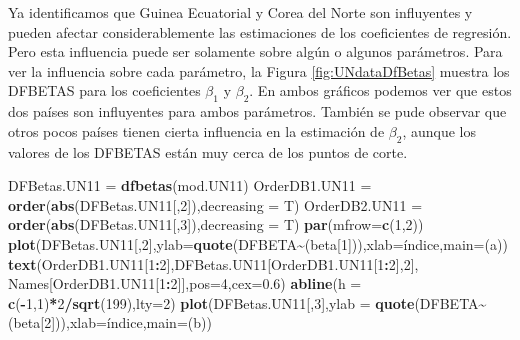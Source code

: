 \documentclass[
]{article}
\newenvironment{Shaded}{\begin{snugshade}}{\end{snugshade}}
\newcommand{\AttributeTok}[1]{\textcolor[rgb]{0.13,0.29,0.53}{#1}}
\newcommand{\DecValTok}[1]{\textcolor[rgb]{0.00,0.00,0.81}{#1}}
\newcommand{\FloatTok}[1]{\textcolor[rgb]{0.00,0.00,0.81}{#1}}
\newcommand{\FunctionTok}[1]{\textcolor[rgb]{0.13,0.29,0.53}{\textbf{#1}}}
\newcommand{\NormalTok}[1]{#1}
\newcommand{\OtherTok}[1]{\textcolor[rgb]{0.56,0.35,0.01}{#1}}
\newcommand{\SpecialCharTok}[1]{\textcolor[rgb]{0.81,0.36,0.00}{\textbf{#1}}}
\newcommand{\StringTok}[1]{\textcolor[rgb]{0.31,0.60,0.02}{#1}}
\begin{document}
Ya identificamos que Guinea Ecuatorial y Corea del Norte son influyentes y pueden afectar considerablemente las estimaciones de los coeficientes de regresión. Pero esta influencia puede ser solamente sobre algún o algunos parámetros. Para ver la influencia sobre cada parámetro, la Figura \ref{fig:UNdataDfBetas} muestra los DFBETAS para los coeficientes \(\beta_{1}\) y \(\beta_{2}\). En ambos gráficos podemos ver que estos dos países son influyentes para ambos parámetros. También se pude observar que otros pocos países tienen cierta influencia en la estimación de \(\beta_{2}\), aunque los valores de los DFBETAS están muy cerca de los puntos de corte.

\begin{Shaded}
\begin{Highlighting}[]
\NormalTok{DFBetas.UN11 }\OtherTok{=} \FunctionTok{dfbetas}\NormalTok{(mod.UN11)}
\NormalTok{OrderDB1.UN11 }\OtherTok{=} \FunctionTok{order}\NormalTok{(}\FunctionTok{abs}\NormalTok{(DFBetas.UN11[,}\DecValTok{2}\NormalTok{]),}\AttributeTok{decreasing =}\NormalTok{ T)}
\NormalTok{OrderDB2.UN11 }\OtherTok{=} \FunctionTok{order}\NormalTok{(}\FunctionTok{abs}\NormalTok{(DFBetas.UN11[,}\DecValTok{3}\NormalTok{]),}\AttributeTok{decreasing =}\NormalTok{ T)}
\FunctionTok{par}\NormalTok{(}\AttributeTok{mfrow=}\FunctionTok{c}\NormalTok{(}\DecValTok{1}\NormalTok{,}\DecValTok{2}\NormalTok{))}
\FunctionTok{plot}\NormalTok{(DFBetas.UN11[,}\DecValTok{2}\NormalTok{],}\AttributeTok{ylab=}\FunctionTok{quote}\NormalTok{(}\StringTok{\textquotesingle{}DFBETA\textquotesingle{}}\SpecialCharTok{\textasciitilde{}}\NormalTok{(beta[}\DecValTok{1}\NormalTok{])),}\AttributeTok{xlab=}\StringTok{\textquotesingle{}índice\textquotesingle{}}\NormalTok{,}\AttributeTok{main=}\StringTok{\textquotesingle{}(a)\textquotesingle{}}\NormalTok{)}
\FunctionTok{text}\NormalTok{(OrderDB1.UN11[}\DecValTok{1}\SpecialCharTok{:}\DecValTok{2}\NormalTok{],DFBetas.UN11[OrderDB1.UN11[}\DecValTok{1}\SpecialCharTok{:}\DecValTok{2}\NormalTok{],}\DecValTok{2}\NormalTok{],}
\NormalTok{     Names[OrderDB1.UN11[}\DecValTok{1}\SpecialCharTok{:}\DecValTok{2}\NormalTok{]],}\AttributeTok{pos=}\DecValTok{4}\NormalTok{,}\AttributeTok{cex=}\FloatTok{0.6}\NormalTok{)}
\FunctionTok{abline}\NormalTok{(}\AttributeTok{h =} \FunctionTok{c}\NormalTok{(}\SpecialCharTok{{-}}\DecValTok{1}\NormalTok{,}\DecValTok{1}\NormalTok{)}\SpecialCharTok{*}\DecValTok{2}\SpecialCharTok{/}\FunctionTok{sqrt}\NormalTok{(}\DecValTok{199}\NormalTok{),}\AttributeTok{lty=}\DecValTok{2}\NormalTok{)}
\FunctionTok{plot}\NormalTok{(DFBetas.UN11[,}\DecValTok{3}\NormalTok{],}\AttributeTok{ylab =} \FunctionTok{quote}\NormalTok{(}\StringTok{\textquotesingle{}DFBETA\textquotesingle{}}\SpecialCharTok{\textasciitilde{}}\NormalTok{(beta[}\DecValTok{2}\NormalTok{])),}\AttributeTok{xlab=}\StringTok{\textquotesingle{}índice\textquotesingle{}}\NormalTok{,}\AttributeTok{main=}\StringTok{\textquotesingle{}(b)\textquotesingle{}}\NormalTok{)}

\end{Highlighting}
\end{Shaded}
\end{document}
